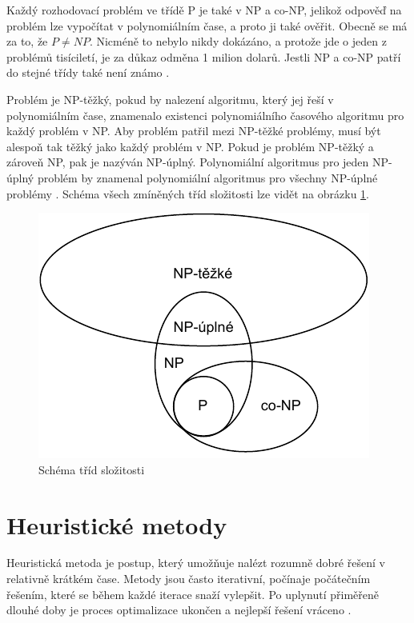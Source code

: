 Každý rozhodovací problém ve třídě P je také v NP a co-NP, jelikož odpověď na problém lze vypočítat v polynomiálním čase, a proto ji také ověřit.
Obecně se má za to, že $P\neq NP$.
Nicméně to nebylo nikdy dokázáno, a protože jde o jeden z problémů tisíciletí, je za důkaz odměna 1 milion dolarů.
Jestli NP a co-NP patří do stejné třídy také není známo \cite{erickson}.

Problém je NP-těžký, pokud by nalezení algoritmu, který jej řeší v polynomiálním čase, znamenalo existenci polynomiálního časového algoritmu pro každý problém v NP.
Aby problém patřil mezi NP-těžké problémy, musí být alespoň tak těžký jako každý problém v NP.
Pokud je problém NP-těžký a zároveň NP, pak je nazýván NP-úplný.
Polynomiální algoritmus pro jeden NP-úplný problém by znamenal polynomiální algoritmus pro všechny NP-úplné problémy \cite{erickson}.
Schéma všech zmíněných tříd složitosti lze vidět na obrázku \ref{fig:complexity-classes}.

\begin{figure}[htbp]
\centerline{\includegraphics[scale=0.8]{img/complexity-classes.pdf}}
\caption{Schéma tříd složitosti}
\label{fig:complexity-classes}
\end{figure}

\section{Heuristické metody}
Heuristická metoda je postup, který umožňuje nalézt rozumně dobré řešení v relativně krátkém čase.
Metody jsou často iterativní, počínaje počátečním řešením, které se během každé iterace snaží vylepšit.
Po uplynutí přiměřeně dlouhé doby je proces optimalizace ukončen a nejlepší řešení vráceno \cite{kaveh}.

